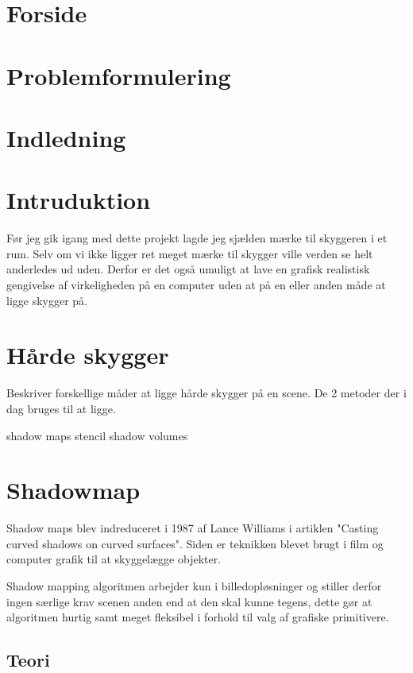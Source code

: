 \documentclass[11pt,a4paper]{article}
\begin{document}
\section{Forside}

\section{Problemformulering}



\section{Indledning}


\section{Intruduktion}
Før jeg gik igang med dette projekt lagde jeg sjælden mærke til skyggeren i et rum. Selv om vi ikke ligger ret meget mærke til skygger ville verden se helt anderledes ud uden. Derfor er det også umuligt at lave en grafisk realistisk gengivelse af virkeligheden på en computer uden at på en eller anden måde at ligge skygger på.

\section{Hårde skygger}
Beskriver forskellige måder at ligge hårde skygger på en scene. De 2 metoder der i dag bruges til at ligge.

shadow maps
stencil shadow volumes

\newpage 
\section{Shadowmap}

Shadow maps blev indreduceret i 1987 af Lance Williams i artiklen "Casting curved shadows on curved surfaces". Siden er teknikken blevet brugt i film og computer grafik til at skyggelægge objekter.

Shadow mapping algoritmen arbejder kun i billedopløsninger og stiller derfor ingen særlige krav scenen anden end at den skal kunne tegens, dette gør at algoritmen hurtig samt meget fleksibel i forhold til valg af grafiske primitivere.


\subsection{Teori}
\end{document}

